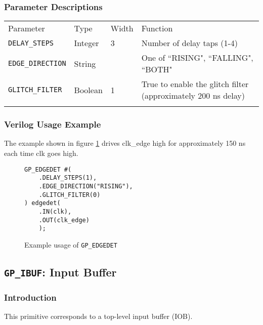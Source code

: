 \documentclass[11pt]{article}
\newcommand{\tokenstyle}[1]{\texttt{#1}}
\newcommand{\whenstyle}[1]{{\fontseries{sb}\selectfont#1}}
\newcommand{\thinhline}{\Xhline{1\arrayrulewidth}}
\newcommand{\thickhline}{\Xhline{2.5\arrayrulewidth}}
\begin{document}
\subsubsection{Parameter Descriptions}

\begin{tabularx}{\textwidth}{lllX}
\thinhline
\whenstyle{Parameter} & \whenstyle{Type} & \whenstyle{Width} & \whenstyle{Function} \\
\thickhline
\tokenstyle{DELAY\_STEPS} & Integer & 3 & Number of delay taps (1-4) \\
\thinhline
\tokenstyle{EDGE\_DIRECTION} & String & & One of ``RISING", ``FALLING", ``BOTH" \\
\thinhline
\tokenstyle{GLITCH\_FILTER} & Boolean & 1 & True to enable the glitch filter (approximately 200 ns delay) \\
\thinhline
\end{tabularx}

\subsubsection{Verilog Usage Example}

The example shown in figure \ref{gp-edgedet-example} drives clk\_edge high for approximately 150 ns each time clk goes
high.

\begin{figure}[h]
\begin{lstlisting}
GP_EDGEDET #(
    .DELAY_STEPS(1),
    .EDGE_DIRECTION("RISING"),
    .GLITCH_FILTER(0)
) edgedet(
	.IN(clk),
	.OUT(clk_edge)
	);
\end{lstlisting}
\caption{Example usage of \tokenstyle{GP\_EDGEDET}}
\label{gp-edgedet-example}
\end{figure}


\pagebreak
\subsection{\tokenstyle{GP\_IBUF}: Input Buffer}
\label{gp-ibuf}

\subsubsection{Introduction}
This primitive corresponds to a top-level input buffer (IOB).
\end{document}
